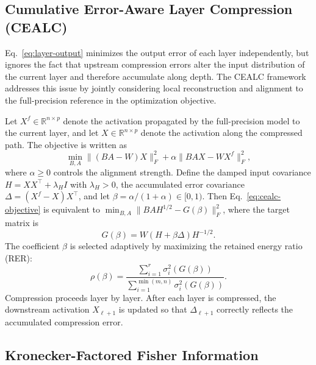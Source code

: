 \documentclass[a4paper,fleqn]{cas-dc}
\begin{document}
\subsection{Cumulative Error-Aware Layer Compression (CEALC)}

Eq.~\eqref{eq:layer-output} minimizes the output error of each layer independently, but ignores the fact that upstream compression errors alter the input distribution of the current layer and therefore accumulate along depth. The CEALC framework \citep{saessvd2025} addresses this issue by jointly considering local reconstruction and alignment to the full-precision reference in the optimization objective.

Let $X^f \in \mathbb{R}^{n \times p}$ denote the activation propagated by the full-precision model to the current layer, and let $X \in \mathbb{R}^{n \times p}$ denote the activation along the compressed path. The objective is written as
\begin{equation}
\min_{B,A} \|(BA - W)X\|_F^2 + \alpha \|BAX - WX^f\|_F^2,
\label{eq:cealc-objective}
\end{equation}
where $\alpha \ge 0$ controls the alignment strength. Define the damped input covariance $H = XX^\top + \lambda_H I$ with $\lambda_H > 0$, the accumulated error covariance $\Delta = (X^f - X)X^\top$, and let $\beta = \alpha/(1+\alpha) \in [0,1)$. Then Eq.~\eqref{eq:cealc-objective} is equivalent to $\min_{B,A} \|BAH^{1/2} - G(\beta)\|_F^2$, where the target matrix is
\begin{equation}
G(\beta) = W(H + \beta \Delta)H^{-1/2}.
\label{eq:cealc-target}
\end{equation}
The coefficient $\beta$ is selected adaptively by maximizing the retained energy ratio (RER):
\begin{equation}
\rho(\beta) = \frac{\sum_{i=1}^{r} \sigma_i^2(G(\beta))}{\sum_{i=1}^{\min(m,n)} \sigma_i^2(G(\beta))}.
\label{eq:cealc-rer}
\end{equation}
Compression proceeds layer by layer. After each layer is compressed, the downstream activation $X_{\ell+1}$ is updated so that $\Delta_{\ell+1}$ correctly reflects the accumulated compression error.

\subsection{Kronecker-Factored Fisher Information}
\end{document}

